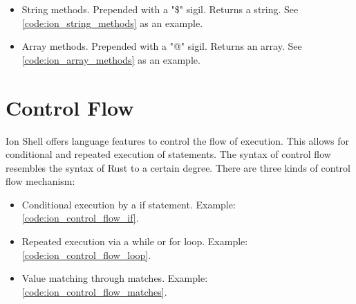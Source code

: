 \begin{itemize}
	\item String methods. Prepended with a "\$" sigil. Returns a string. See \ref{code:ion_string_methods} as an example.
	\item Array methods. Prepended with a "@" sigil. Returns an array. See \ref{code:ion_array_methods} as an example.
\end{itemize}


\clearpage

\section{Control Flow}\label{ion_shell_lang_control_flow}

Ion Shell offers language features to control the flow of execution.
This allows for conditional and repeated execution of statements.
The syntax of control flow resembles the syntax of Rust to a certain degree.
There are three kinds of control flow mechanism:

\begin{itemize}
	\item Conditional execution by a if statement. Example: \ref{code:ion_control_flow_if}.
	\item Repeated execution via a while or for loop. Example: \ref{code:ion_control_flow_loop}.
	\item Value matching through matches. Example: \ref{code:ion_control_flow_matches}.
\end{itemize}


\clearpage


